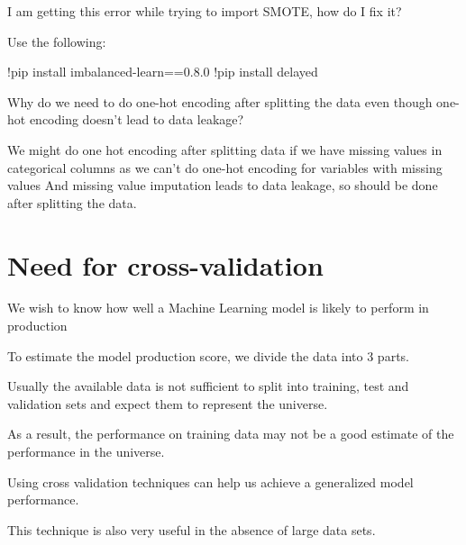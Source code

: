 	\begin{qanda}
		\begin{question}
I am getting this error while trying to import SMOTE, how do I fix it?
		\end{question}

		\begin{answer}
Use the following:
			\begin{code}[\codenumbering]{}
				!pip install imbalanced-learn==0.8.0
				!pip install delayed
			\end{code}
		\end{answer}
	\end{qanda}



	\begin{qanda}
		\begin{question}
Why do we need to do one-hot encoding after splitting the data even though one-hot encoding doesn't lead to data leakage?
		\end{question}

		\begin{answer}
We might do one hot encoding after splitting data if we have missing values in categorical columns as we can't do one-hot encoding for variables with missing values
And missing value imputation leads to data leakage, so should be done after splitting the data.
		\end{answer}
	\end{qanda}


	\section{Need for cross-validation}
	\begin{bulletedlist}
		\item We wish to know how well a Machine Learning model is likely to perform in production
		\item To estimate the model production score, we divide the data into 3 parts.
		\item Usually the available data is not sufficient to split into training, test and validation sets and expect them to represent the universe.
		\item As a result, the performance on training data may not be a good estimate of the performance in the universe.
		\item Using cross validation techniques can help us achieve a generalized model performance.
		\item This technique is also very useful in the absence of large data sets.
	\end{bulletedlist}

